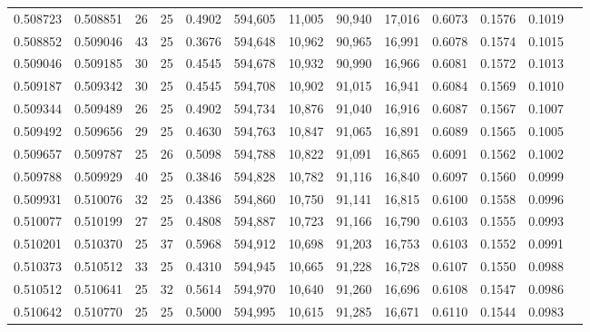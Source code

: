 \begin{tabular}{rrrrrrrrrrrrr}
0.508723 & 0.508851 &    26 &  25 &                                     0.4902 & 594,605 &  11,005 &  90,940 &  17,016 & 0.6073 & 0.1576 & 0.1019 \\
0.508852 & 0.509046 &    43 &  25 &                                     0.3676 & 594,648 &  10,962 &  90,965 &  16,991 & 0.6078 & 0.1574 & 0.1015 \\
0.509046 & 0.509185 &    30 &  25 &                                     0.4545 & 594,678 &  10,932 &  90,990 &  16,966 & 0.6081 & 0.1572 & 0.1013 \\
0.509187 & 0.509342 &    30 &  25 &                                     0.4545 & 594,708 &  10,902 &  91,015 &  16,941 & 0.6084 & 0.1569 & 0.1010 \\
0.509344 & 0.509489 &    26 &  25 &                                     0.4902 & 594,734 &  10,876 &  91,040 &  16,916 & 0.6087 & 0.1567 & 0.1007 \\
0.509492 & 0.509656 &    29 &  25 &                                     0.4630 & 594,763 &  10,847 &  91,065 &  16,891 & 0.6089 & 0.1565 & 0.1005 \\
0.509657 & 0.509787 &    25 &  26 &                                     0.5098 & 594,788 &  10,822 &  91,091 &  16,865 & 0.6091 & 0.1562 & 0.1002 \\
0.509788 & 0.509929 &    40 &  25 &                                     0.3846 & 594,828 &  10,782 &  91,116 &  16,840 & 0.6097 & 0.1560 & 0.0999 \\
0.509931 & 0.510076 &    32 &  25 &                                     0.4386 & 594,860 &  10,750 &  91,141 &  16,815 & 0.6100 & 0.1558 & 0.0996 \\
0.510077 & 0.510199 &    27 &  25 &                                     0.4808 & 594,887 &  10,723 &  91,166 &  16,790 & 0.6103 & 0.1555 & 0.0993 \\
0.510201 & 0.510370 &    25 &  37 &                                     0.5968 & 594,912 &  10,698 &  91,203 &  16,753 & 0.6103 & 0.1552 & 0.0991 \\
0.510373 & 0.510512 &    33 &  25 &                                     0.4310 & 594,945 &  10,665 &  91,228 &  16,728 & 0.6107 & 0.1550 & 0.0988 \\
0.510512 & 0.510641 &    25 &  32 &                                     0.5614 & 594,970 &  10,640 &  91,260 &  16,696 & 0.6108 & 0.1547 & 0.0986 \\
0.510642 & 0.510770 &    25 &  25 &                                     0.5000 & 594,995 &  10,615 &  91,285 &  16,671 & 0.6110 & 0.1544 & 0.0983 \\

\end{tabular}
